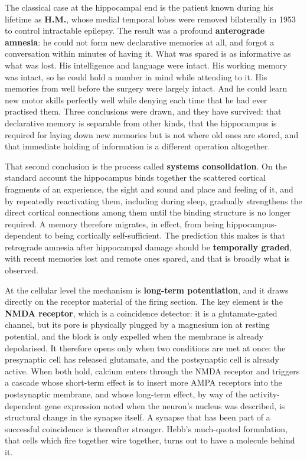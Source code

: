 \documentclass[11pt]{article}
\begin{document}
The classical case at the hippocampal end is the patient known during his lifetime as \textbf{H.M.}, whose medial temporal lobes were removed bilaterally in 1953 to control intractable epilepsy. The result was a profound \textbf{anterograde amnesia}: he could not form new declarative memories at all, and forgot a conversation within minutes of having it. What was spared is as informative as what was lost. His intelligence and language were intact. His working memory was intact, so he could hold a number in mind while attending to it. His memories from well before the surgery were largely intact. And he could learn new motor skills perfectly well while denying each time that he had ever practised them. Three conclusions were drawn, and they have survived: that declarative memory is separable from other kinds, that the hippocampus is required for laying down new memories but is not where old ones are stored, and that immediate holding of information is a different operation altogether.

That second conclusion is the process called \textbf{systems consolidation}. On the standard account the hippocampus binds together the scattered cortical fragments of an experience, the sight and sound and place and feeling of it, and by repeatedly reactivating them, including during sleep, gradually strengthens the direct cortical connections among them until the binding structure is no longer required. A memory therefore migrates, in effect, from being hippocampus-dependent to being cortically self-sufficient. The prediction this makes is that retrograde amnesia after hippocampal damage should be \textbf{temporally graded}, with recent memories lost and remote ones spared, and that is broadly what is observed.

At the cellular level the mechanism is \textbf{long-term potentiation}, and it draws directly on the receptor material of the firing section. The key element is the \textbf{NMDA receptor}, which is a coincidence detector: it is a glutamate-gated channel, but its pore is physically plugged by a magnesium ion at resting potential, and the block is only expelled when the membrane is already depolarised. It therefore opens only when two conditions are met at once: the presynaptic cell has released glutamate, and the postsynaptic cell is already active. When both hold, calcium enters through the NMDA receptor and triggers a cascade whose short-term effect is to insert more AMPA receptors into the postsynaptic membrane, and whose long-term effect, by way of the activity-dependent gene expression noted when the neuron's nucleus was described, is structural change in the synapse itself. A synapse that has been part of a successful coincidence is thereafter stronger. Hebb's much-quoted formulation, that cells which fire together wire together, turns out to have a molecule behind it.
\end{document}
